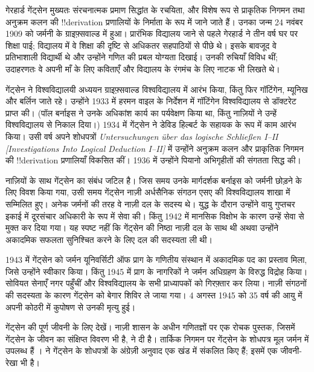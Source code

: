 \documentclass[../../../include/open-logic-section]{subfiles}
\begin{document}



गेरहार्ड गेंट्सेन मुख्यतः संरचनात्मक प्रमाण सिद्धांत के रचयिता, और विशेष
रूप से प्राकृतिक निगमन तथा अनुक्रम कलन की !!{derivation} प्रणालियों के
निर्माता के रूप में जाने जाते हैं। उनका जन्म 24 नवंबर 1909 को जर्मनी के
ग्राइफ़्सवाल्ड में हुआ। प्रारंभिक विद्यालय जाने से पहले गेरहार्ड ने तीन वर्ष
घर पर शिक्षा पाई; विद्यालय में वे शिक्षा की दृष्टि से अधिकतर सहपाठियों से
पीछे थे। इसके बावजूद वे प्रतिभाशाली विद्यार्थी थे और उन्होंने गणित की प्रबल
योग्यता दिखाई। उनकी रुचियाँ विविध थीं; उदाहरणतः वे अपनी माँ के लिए कविताएँ
और विद्यालय के रंगमंच के लिए नाटक भी लिखते थे।

गेंट्सेन ने विश्वविद्यालयी अध्ययन ग्राइफ़्सवाल्ड विश्वविद्यालय में आरंभ
किया, किंतु फिर गॉटिंगेन, म्यूनिख और बर्लिन जाते रहे। उन्होंने 1933 में हरमन
वाइल के निर्देशन में गॉटिंगेन विश्वविद्यालय से डॉक्टरेट प्राप्त की। (पॉल
बर्नाइस ने उनके अधिकांश कार्य का पर्यवेक्षण किया था, किंतु नाज़ियों ने उन्हें
विश्वविद्यालय से निकाल दिया।) 1934 में गेंट्सेन ने डेविड हिल्बर्ट के सहायक
के रूप में काम आरंभ किया। उसी वर्ष अपने शोधपत्रों \emph{Untersuchungen
\"{u}ber das logische Schlie\ss en I--II [Investigations Into Logical
Deduction I--II]} में उन्होंने अनुक्रम कलन और प्राकृतिक निगमन की
!!{derivation} प्रणालियाँ विकसित कीं। 1936 में उन्होंने पियानो अभिगृहीतों की
संगतता सिद्ध की।

नाज़ियों के साथ गेंट्सेन का संबंध जटिल है। जिस समय उनके मार्गदर्शक बर्नाइस
को जर्मनी छोड़ने के लिए विवश किया गया, उसी समय गेंट्सेन नाज़ी अर्धसैनिक
संगठन एसए की विश्वविद्यालय शाखा में सम्मिलित हुए। अनेक जर्मनों की तरह वे
नाज़ी दल के सदस्य थे। युद्ध के दौरान उन्होंने वायु गुप्तचर इकाई में दूरसंचार
अधिकारी के रूप में सेवा की। किंतु 1942 में मानसिक विक्षोभ के कारण उन्हें
सेवा से मुक्त कर दिया गया। यह स्पष्ट नहीं कि गेंट्सेन की निष्ठा नाज़ी दल के
साथ थी अथवा उन्होंने अकादमिक सफलता सुनिश्चित करने के लिए दल की सदस्यता ली
थी।

1943 में गेंट्सेन को जर्मन यूनिवर्सिटी ऑफ प्राग के गणितीय संस्थान में
अकादमिक पद का प्रस्ताव मिला, जिसे उन्होंने स्वीकार किया। किंतु 1945 में
प्राग के नागरिकों ने जर्मन अधिग्रहण के विरुद्ध विद्रोह किया। सोवियत सेनाएँ
नगर पहुँचीं और विश्वविद्यालय के सभी प्राध्यापकों को गिरफ़्तार कर लिया। नाज़ी
संगठनों की सदस्यता के कारण गेंट्सेन को बेगार शिविर ले जाया गया। 4 अगस्त 1945
को 35 वर्ष की आयु में अपनी कोठरी में कुपोषण से उनकी मृत्यु हुई।

\begin{reading}
गेंट्सेन की पूर्ण जीवनी के लिए \citet{Menzler-Trott2007} देखें। नाज़ी शासन
के अधीन गणितज्ञों पर एक रोचक पुस्तक, जिसमें गेंट्सेन के जीवन का संक्षिप्त
विवरण भी है, \citet{Segal2014} ने दी है। तार्किक निगमन पर गेंट्सेन के
शोधपत्र मूल जर्मन में उपलब्ध हैं \citep{Gentzen1935a,Gentzen1935b}।
\citet{Gentzen1969} ने गेंट्सेन के शोधपत्रों के अंग्रेज़ी अनुवाद एक खंड में
संकलित किए हैं; इसमें एक जीवनी-रेखा भी है।
\end{reading}
\end{document}
